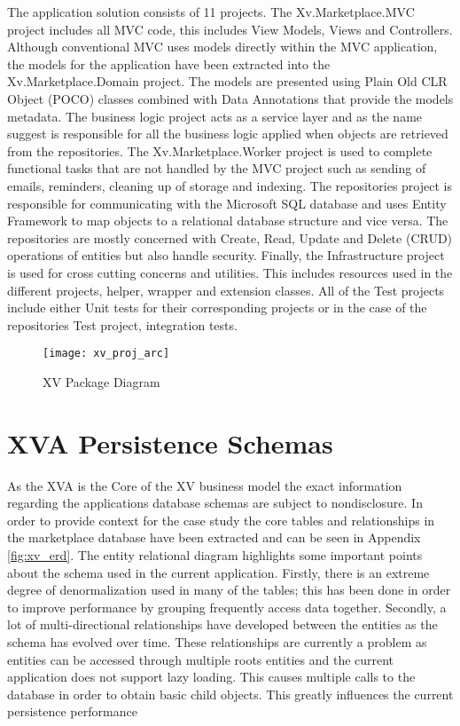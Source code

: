 The application solution consists of 11 projects. The Xv.Marketplace.MVC project includes all MVC code, this includes View Models, Views and Controllers. Although conventional MVC uses models directly within the MVC application, the models for the application have been extracted into the Xv.Marketplace.Domain project. The models are presented using Plain Old CLR Object (POCO) classes combined with Data Annotations that provide the models metadata. The business logic project acts as a service layer and as the name suggest is responsible for all the business logic applied when objects are retrieved from the repositories. The Xv.Marketplace.Worker project is used to complete functional tasks that are not handled by the MVC project such as sending of emails, reminders, cleaning up of storage and indexing. The repositories project is responsible for communicating with the Microsoft SQL database and uses Entity Framework to map objects to a relational database structure and vice versa. The repositories are mostly concerned with Create, Read, Update and Delete (CRUD) operations of entities but also handle security. Finally, the Infrastructure project is used for cross cutting concerns and utilities. This includes resources used in the different projects, helper, wrapper and extension classes. All of the Test projects include either Unit tests for their corresponding projects or in the case of the repositories Test project, integration tests.


\begin{figure}
\centering
\texttt{[image: xv\_proj\_arc]}
\caption{XV Package Diagram}
\label{fig:xv_proj_arc}
\end{figure}


\section{XVA Persistence Schemas}

As the XVA is the Core of the XV business model the exact information regarding the applications database schemas are subject to nondisclosure. In order to provide context for the case study the core tables and relationships in the marketplace database have been extracted and can be seen in Appendix \ref{fig:xv_erd}. The entity relational diagram highlights some important points about the schema used in the current application. Firstly, there is an extreme degree of denormalization used in many of the tables; this has been done in order to improve performance by grouping frequently access data together. Secondly, a lot of multi-directional relationships have developed between the entities as the schema has evolved over time. These relationships are currently a problem as entities can be accessed through multiple roots entities and the current application does not support lazy loading. This causes multiple calls to the database in order to obtain basic child objects. This greatly influences the current persistence performance



